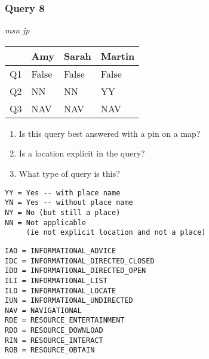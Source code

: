 \begin{frame}[fragile]
\frametitle{Query 8}
\vspace{1em}

\emph{msn jp}

\vfill

\begin{table}
  \centering
  \begin{tabular}{ l l l l }
    & \textbf{Amy} & \textbf{Sarah} & \textbf{Martin}\\
    \toprule
    Q1 & False & False & False\\
Q2 & NN & NN & YY\\
Q3 & NAV & NAV & NAV\\
    \bottomrule
  \end{tabular}
\end{table}

\vfill

\tiny{

\begin{enumerate}
\item Is this query best answered with a pin on a map?
\item Is a location explicit in the query?
\item What type of query is this?
\end{enumerate}

\vfill

\begin{multicols}{2}
\begin{verbatim}
YY = Yes -- with place name
YN = Yes -- without place name
NY = No (but still a place)
NN = Not applicable 
     (ie not explicit location and not a place)
\end{verbatim}

\columnbreak
\begin{verbatim}
IAD = INFORMATIONAL_ADVICE
IDC = INFORMATIONAL_DIRECTED_CLOSED
IDO = INFORMATIONAL_DIRECTED_OPEN
ILI = INFORMATIONAL_LIST
ILO = INFORMATIONAL_LOCATE
IUN = INFORMATIONAL_UNDIRECTED
NAV = NAVIGATIONAL
RDE = RESOURCE_ENTERTAINMENT
RDO = RESOURCE_DOWNLOAD
RIN = RESOURCE_INTERACT
ROB = RESOURCE_OBTAIN
\end{verbatim}
\end{multicols}
}

\end{frame}


